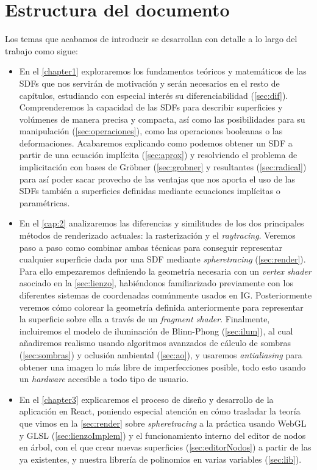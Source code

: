 \section*{Estructura del documento}
Los temas que acabamos de introducir se desarrollan con detalle a lo largo del trabajo como sigue:
\begin{itemize}
    \item En el \autoref{chapter1} exploraremos los fundamentos teóricos y matemáticos de las SDFs que nos servirán de motivación y serán necesarios en el resto de capítulos, estudiando con especial interés su diferenciabilidad (\autoref{sec:dif}). Comprenderemos la capacidad de las SDFs para describir superficies y volúmenes de manera precisa y compacta, así como las posibilidades para su manipulación (\autoref{sec:operaciones}), como las operaciones booleanas o las deformaciones. Acabaremos explicando como podemos obtener un SDF a partir de una ecuación implícita (\autoref{sec:aprox}) y resolviendo el problema de implicitación con bases de Gröbner (\autoref{sec:grobner} y resultantes (\autoref{sec:radical}) para así poder sacar provecho de las ventajas que nos aporta el uso de las SDFs también a superficies definidas mediante ecuaciones implícitas o paramétricas. 
    
    \item En el \autoref{cap:2} analizaremos las diferencias y similitudes de los dos principales métodos de renderizado actuales: la rasterización y el \textit{raytracing}. Veremos paso a paso como combinar ambas técnicas para conseguir representar cualquier superficie dada por una SDF mediante \textit{spheretracing} (\autoref{sec:render}). Para ello empezaremos definiendo la geometría necesaria con un \textit{vertex shader} asociado en la \autoref{sec:lienzo}, habiéndonos familiarizado previamente con los diferentes sistemas de coordenadas comúnmente usados en IG. Posteriormente veremos cómo colorear la geometría definida anteriormente para representar la superficie sobre ella a través de un \textit{fragment shader}. Finalmente, incluiremos el modelo de iluminación de Blinn-Phong (\autoref{sec:ilum}), al cual añadiremos realismo usando algoritmos avanzados de cálculo de sombras (\autoref{sec:sombras}) y oclusión ambiental (\autoref{sec:ao}), y usaremos \textit{antialiasing} para obtener una imagen lo más libre de imperfecciones posible, todo esto usando un \textit{hardware} accesible a todo tipo de usuario.
    
    \item En el \autoref{chapter3} explicaremos el proceso de diseño y desarrollo de la aplicación en React, poniendo especial atención en cómo trasladar la teoría que vimos en la \autoref{sec:render} sobre \textit{spheretracing} a la práctica usando WebGL y GLSL (\autoref{sec:lienzoImplem}) y el funcionamiento interno del editor de nodos en árbol, con el que crear nuevas superficies (\autoref{sec:editorNodos}) a partir de las ya existentes, y nuestra librería de polinomios en varias variables (\autoref{sec:lib}).
    

\end{itemize}

